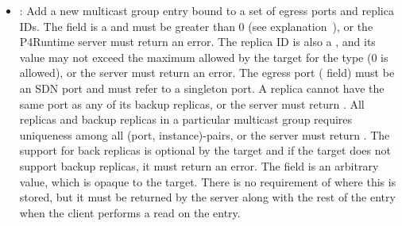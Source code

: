\documentclass[11pt]{article}
\begin{document}
{\begin{itemize}[noitemsep,topsep=\mdcompacttopsep]
\item{}: Add a new multicast group entry bound to a set of egress ports and
replica IDs. The  field is a  and must be greater
than 0 (see explanation~), or the
P4Runtime server must return an  error. The replica
 ID is also a , and its value may not exceed the maximum
allowed by the target for the  type (0 is allowed), or the
server must return an  error. The egress port ( field)
must be an SDN port and must refer to a singleton port. A replica cannot have
the same port as any of its backup replicas, or the server must return
. All replicas and backup replicas in a particular
multicast group requires uniqueness among all (port, instance)-pairs, or the
server must return . The support for back replicas is
optional by the target and if the target does not support backup replicas,
it must return an  error. The  field is an arbitrary
 value, which is opaque to the target. There is no requirement of
where this is stored, but it must be returned by the server along with the
rest of the entry when the client performs a read on the entry.%


\end{itemize}}
\end{document}
